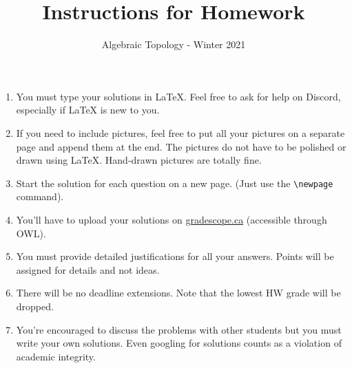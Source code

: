 \documentclass{article}
\title{Instructions for Homework}
\author{Algebraic Topology - Winter 2021}
\date{}
\begin{document}
\maketitle 

\begin{enumerate}
    \item You must type your solutions in \LaTeX. Feel free to ask for help on Discord, especially if \LaTeX{} is new to you.
    \item If you need to include pictures, feel free to put all your pictures on a separate page and append them at the end. The pictures do not have to be polished or drawn using \LaTeX. Hand-drawn pictures are totally fine. 
    \item Start the solution for each question on a new page. (Just use the \verb|\newpage| command).
    \item You'll have to upload your solutions on \url{gradescope.ca} (accessible through OWL).
    \item You must provide detailed justifications for all your answers. Points will be assigned for details and not ideas.
    \item There will be no deadline extensions. Note that the lowest HW grade will be dropped.
    \item You're encouraged to discuss the problems with other students but you must write your own solutions. Even googling for solutions counts as a violation of academic integrity.

    
\end{enumerate}
\end{document}
